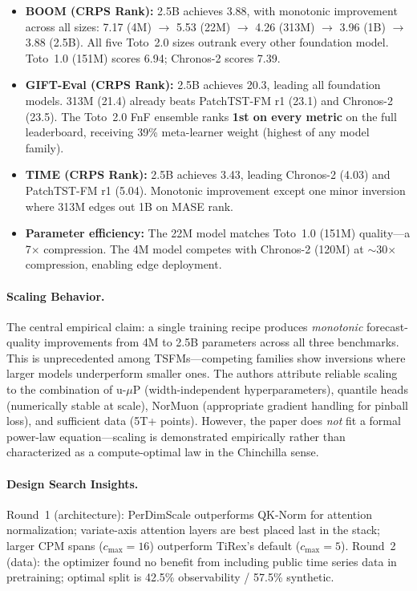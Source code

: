 \documentclass[11pt,a4paper]{article}
\begin{document}
\begin{itemize}[nosep]
    \item \textbf{BOOM (CRPS Rank):} 2.5B achieves 3.88, with monotonic improvement across all sizes: 7.17 (4M) $\to$ 5.53 (22M) $\to$ 4.26 (313M) $\to$ 3.96 (1B) $\to$ 3.88 (2.5B). All five Toto~2.0 sizes outrank every other foundation model. Toto~1.0 (151M) scores 6.94; Chronos-2 scores 7.39.
    \item \textbf{GIFT-Eval (CRPS Rank):} 2.5B achieves 20.3, leading all foundation models. 313M (21.4) already beats PatchTST-FM r1 (23.1) and Chronos-2 (23.5). The Toto~2.0 FnF ensemble ranks \textbf{1st on every metric} on the full leaderboard, receiving 39\% meta-learner weight (highest of any model family).
    \item \textbf{TIME (CRPS Rank):} 2.5B achieves 3.43, leading Chronos-2 (4.03) and PatchTST-FM r1 (5.04). Monotonic improvement except one minor inversion where 313M edges out 1B on MASE rank.
    \item \textbf{Parameter efficiency:} The 22M model matches Toto~1.0 (151M) quality---a 7$\times$ compression. The 4M model competes with Chronos-2 (120M) at $\sim$30$\times$ compression, enabling edge deployment.
\end{itemize}

\paragraph{Scaling Behavior.}
The central empirical claim: a single training recipe produces \emph{monotonic} forecast-quality improvements from 4M to 2.5B parameters across all three benchmarks. This is unprecedented among TSFMs---competing families show inversions where larger models underperform smaller ones. The authors attribute reliable scaling to the combination of u-$\mu$P (width-independent hyperparameters), quantile heads (numerically stable at scale), NorMuon (appropriate gradient handling for pinball loss), and sufficient data (5T+ points). However, the paper does \emph{not} fit a formal power-law equation---scaling is demonstrated empirically rather than characterized as a compute-optimal law in the Chinchilla sense.

\paragraph{Design Search Insights.}
Round~1 (architecture): PerDimScale outperforms QK-Norm for attention normalization; variate-axis attention layers are best placed last in the stack; larger CPM spans ($c_{\mathrm{max}}=16$) outperform TiRex's default ($c_{\mathrm{max}}=5$). Round~2 (data): the optimizer found no benefit from including public time series data in pretraining; optimal split is 42.5\% observability / 57.5\% synthetic.
\end{document}
